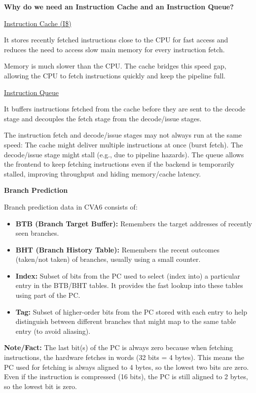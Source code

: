 \documentclass[12pt, a4paper]{article}
\begin{document}
\vspace{0.5em}

\textbf{Why do we need an Instruction Cache and an Instruction Queue?}

\ul{Instruction Cache (I\$)}

It stores recently fetched instructions close to the CPU for fast access and reduces the need to access slow main memory for every instruction fetch.

Memory is much slower than the CPU. The cache bridges this speed gap, allowing the CPU to fetch instructions quickly and keep the pipeline full.

\ul{Instruction Queue}  

It buffers instructions fetched from the cache before they are sent to the decode stage and decouples the fetch stage from the decode/issue stages.

The instruction fetch and decode/issue stages may not always run at the same speed:
The cache might deliver multiple instructions at once (burst fetch).
The decode/issue stage might stall (e.g., due to pipeline hazards).
The queue allows the frontend to keep fetching instructions even if the backend is temporarily stalled, improving throughput and hiding memory/cache latency.

\vspace{0.5em}

\textbf{Branch Prediction}

Branch prediction data in CVA6 consists of:
\begin{itemize}[nosep]
    \item \textbf{BTB (Branch Target Buffer):} Remembers the target addresses of recently seen branches.
    \item \textbf{BHT (Branch History Table):} Remembers the recent outcomes (taken/not taken) of branches, usually using a small counter.
    \item \textbf{Index:} Subset of bits from the PC used to select (index into) a particular entry in the BTB/BHT tables. It provides the fast lookup into these tables using part of the PC.
    \item \textbf{Tag:} Subset of higher-order bits from the PC stored with each entry to help distinguish between different branches that might map to the same table entry (to avoid aliasing).
\end{itemize}

\textbf{Note/Fact:} The last bit(s) of the PC is always zero because when fetching instructions, the hardware fetches in words (32 bits = 4 bytes). This means the PC used for fetching is always aligned to 4 bytes, so the lowest two bits are zero. 
Even if the instruction is compressed (16 bits), the PC is still aligned to 2 bytes, so the lowest bit is zero.
\end{document}
